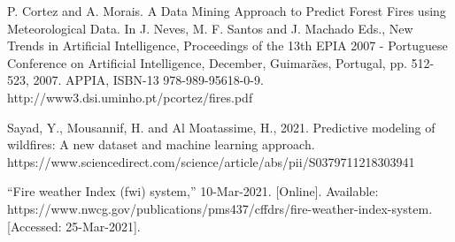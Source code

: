 \documentclass[conference]{IEEEtran}
\begin{document}
\begin{thebibliography}{00}

 P. Cortez and A. Morais. A Data Mining Approach to Predict Forest Fires using Meteorological Data. In J. Neves, M. F. Santos and J. Machado Eds., New Trends in Artificial Intelligence, Proceedings of the 13th EPIA 2007 - Portuguese Conference on Artificial Intelligence, December, Guimarães, Portugal, pp. 512-523, 2007. APPIA, ISBN-13 978-989-95618-0-9. http://www3.dsi.uminho.pt/pcortez/fires.pdf

 Sayad, Y., Mousannif, H. and Al Moatassime, H., 2021. Predictive modeling of wildfires: A new dataset and machine learning approach. https://www.sciencedirect.com/science/article/abs/pii/S0379711218303941

 “Fire weather Index (fwi) system,” 10-Mar-2021. [Online]. Available: https://www.nwcg.gov/publications/pms437/cffdrs/fire-weather-index-system. [Accessed: 25-Mar-2021]. 

\end{thebibliography}
\end{document}

